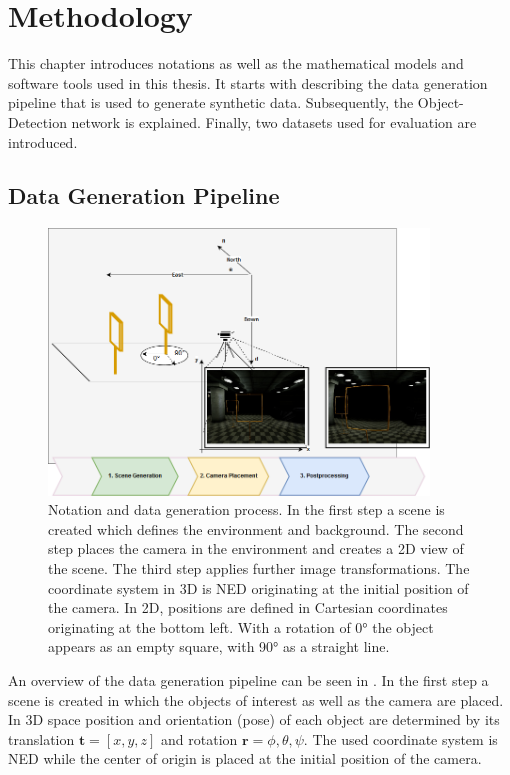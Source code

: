 \chapter{Methodology}
\label{sec:meth}
This chapter introduces notations as well as the mathematical models and software tools used in this thesis. It starts with describing the data generation pipeline that is used to generate synthetic data. Subsequently, the Object-Detection network is explained. Finally, two datasets used for evaluation are introduced.

\section{Data Generation Pipeline}
\label{sec:datagen:method}
\begin{figure}[htbp]
	\centering
	\includegraphics[width=0.9\textwidth]{fig/datagen_notation}
	\caption{Notation and data generation process. In the first step a scene is created which defines the environment and background. The second step places the camera in the environment and creates a 2D view of the scene. The third step applies further image transformations. The coordinate system in 3D is \ac{NED} originating at the initial position of the camera. In 2D, positions are defined in Cartesian coordinates originating at the bottom left. With a rotation of 0° the object appears as an empty square, with 90° as a straight line.}
	\label{fig:training:datagen_notation}
\end{figure}

An overview of the data generation pipeline can be seen in . In the first step a scene is created in which the objects of interest as well as the camera are placed. In 3D space position and orientation (pose) of each object are determined by its translation $\textbf{t} = [x,y,z]$ and rotation $\textbf{r}={\phi, \theta, \psi}$. The used coordinate system is \ac{NED} while the center of origin is placed at the initial position of the camera.

